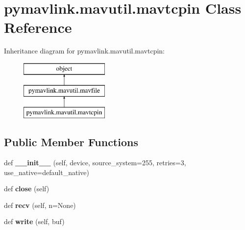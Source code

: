 \hypertarget{classpymavlink_1_1mavutil_1_1mavtcpin}{}\section{pymavlink.\+mavutil.\+mavtcpin Class Reference}
\label{classpymavlink_1_1mavutil_1_1mavtcpin}
Inheritance diagram for pymavlink.\+mavutil.\+mavtcpin\+:\begin{figure}[H]
\begin{center}
\leavevmode
\includegraphics[height=3.000000cm]{classpymavlink_1_1mavutil_1_1mavtcpin}
\end{center}
\end{figure}
\subsection*{Public Member Functions}
\begin{DoxyCompactItemize}
\item 
\mbox{\label{classpymavlink_1_1mavutil_1_1mavtcpin_aba27476b91b3cb0f0540b0965842bca3}} 
def {\bfseries \+\_\+\+\_\+init\+\_\+\+\_\+} (self, device, source\+\_\+system=255, retries=3, use\+\_\+native=default\+\_\+native)
\item 
\mbox{\label{classpymavlink_1_1mavutil_1_1mavtcpin_a729201fdb2c0c2f864f742c88879eeec}} 
def {\bfseries close} (self)
\item 
\mbox{\label{classpymavlink_1_1mavutil_1_1mavtcpin_a51df915724f2169ba96fd97fc0897151}} 
def {\bfseries recv} (self, n=None)
\item 
\mbox{\label{classpymavlink_1_1mavutil_1_1mavtcpin_afa11c00945123d40e77e47015066670d}} 
def {\bfseries write} (self, buf)
\end{DoxyCompactItemize}
